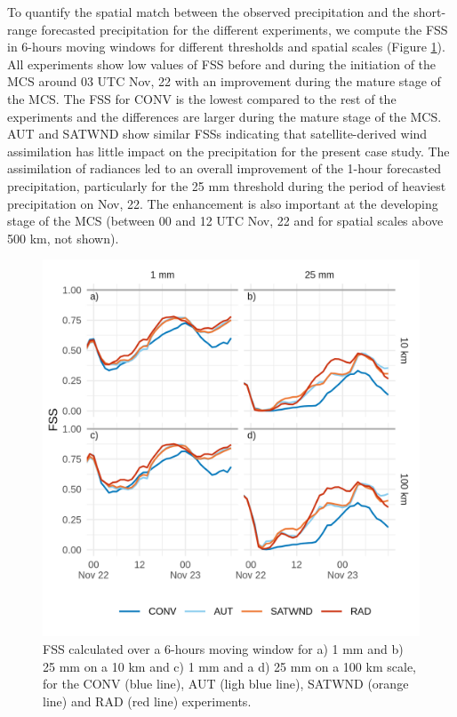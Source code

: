 \documentclass[final,5p,times,twocolumn,authoryear]{elsarticle} %
\begin{document}
To quantify the spatial match between the observed precipitation and the short-range forecasted precipitation for the different experiments, we compute the FSS in 6-hours moving windows for different thresholds and spatial scales (Figure \ref{fig:fss}). All experiments show low values of FSS before and during the initiation of the MCS around 03 UTC Nov, 22 with an improvement during the mature stage of the MCS. The FSS for CONV is the lowest compared to the rest of the experiments and the differences are larger during the mature stage of the MCS. AUT and SATWND show similar FSSs indicating that satellite-derived wind assimilation has little impact on the precipitation for the present case study. The assimilation of radiances led to an overall improvement of the 1-hour forecasted precipitation, particularly for the 25 mm threshold during the period of heaviest precipitation on Nov, 22. The enhancement is also important at the developing stage of the MCS (between 00 and 12 UTC Nov, 22 and for spatial scales above 500 km, not shown).



\begin{figure}
\centering
\includegraphics{../figures/fss-1.png}
\caption{\label{fig:fss}FSS calculated over a 6-hours moving window for a) 1 mm and b) 25 mm on a 10 km and c) 1 mm and a d) 25 mm on a 100 km scale, for the CONV (blue line), AUT (ligh blue line), SATWND (orange line) and RAD (red line) experiments.}
\end{figure}
\end{document}
